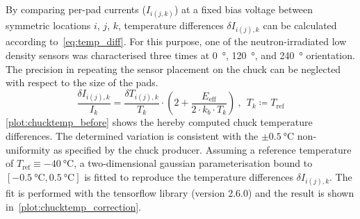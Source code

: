 By comparing per-pad currents ($I_{i(j,k)}$) at a fixed bias voltage between symmetric locations $i$, $j$, $k$, temperature differences $\delta I_{i(j), k}$ can be calculated according to~\ref{eq:temp_diff}.
For this purpose, one of the neutron-irradiated low density sensors was characterised three times at \SI{0}{\degree}, \SI{120}{\degree}, and \SI{240}{\degree} orientation.
The precision in repeating the sensor placement on the chuck can be neglected with respect to the size of the pads. 
\begin{equation}
    \frac{\delta I_{i(j),k}}{I_k} = \frac{\delta T_{i(j), k}}{T_k} \cdot \left(2 + \frac{E_\text{eff}}{2\cdot k_b \cdot T_k} \right)~,~~T_k \coloneqq T_\text{ref}
    \label{eq:temp_diff}
\end{equation}
\ref{plot:chucktemp_before} shows the hereby computed chuck temperature differences.
The determined variation is consistent with the $\pm\SI{0.5}{\celsius}$ non-uniformity as specified by the chuck producer.
Assuming a reference temperature of $T_\text{ref}\equiv\SI{-40}{\celsius}$, a two-dimensional gaussian parameterisation bound to $[\SI{-0.5}{\celsius}, \SI{0.5}{\celsius}]$ is fitted to reproduce the temperature differences $\delta I_{i(j),k}$.
The fit is performed with the tensorflow library (version 2.6.0) and the result is shown in~\ref{plot:chucktemp_correction}.
